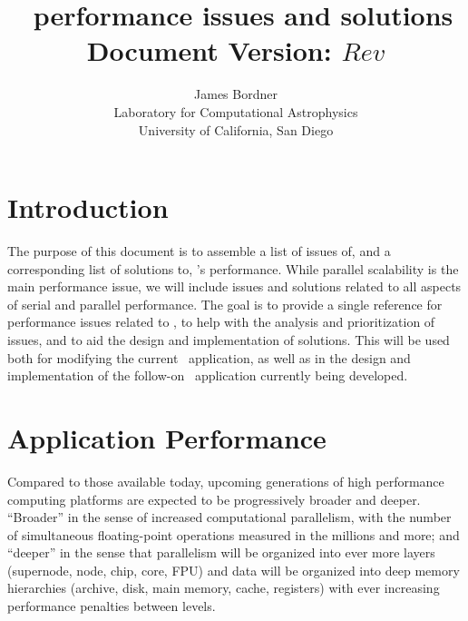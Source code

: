 \documentclass{article}
\begin{document}
\title{ {\huge \enzo\ performance issues and solutions}  \\ \vspace{0.1in}
     \vspace{-0.1in} {\small Document Version: $Rev$ }}
\author{ James Bordner \\
        Laboratory for Computational Astrophysics\\
        University of California, San Diego}
\maketitle

\section{Introduction}

The purpose of this document is to assemble a list of issues of, and a
corresponding list of solutions to, \enzo's performance.  While
parallel scalability is the main performance issue, we will include
issues and solutions related to all aspects of serial and parallel
performance.  The goal is to provide a single reference for
performance issues related to \enzo, to help with the analysis and
prioritization of issues, and to aid the design and implementation of
solutions.  This will be used both for modifying the current \enzo\
application, as well as in the design and implementation of the
follow-on \cello\ application currently being developed.

\section{Application Performance}

Compared to those available today, upcoming generations of high
performance computing platforms are expected to be progressively
broader and deeper.  ``Broader'' in the sense of increased
computational parallelism, with the number of simultaneous
floating-point operations measured in the millions and more; and
``deeper'' in the sense that parallelism will be organized into ever
more layers (supernode, node, chip, core, FPU) and data will be
organized into deep memory hierarchies (archive, disk, main memory,
cache, registers) with ever increasing performance penalties between
levels.
\end{document}
